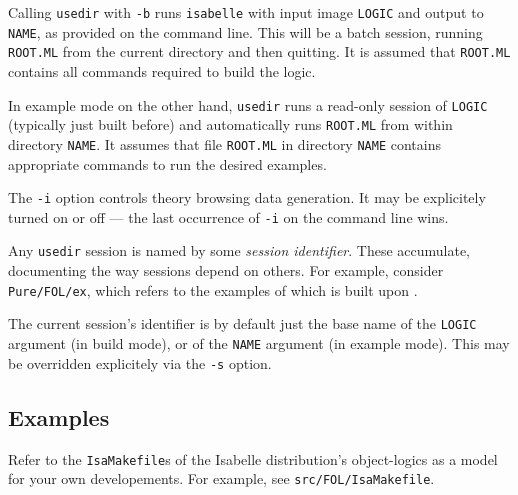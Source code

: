 Calling \texttt{usedir} with \texttt{-b} runs \texttt{isabelle} with
input image \texttt{LOGIC} and output to \texttt{NAME}, as provided on
the command line. This will be a batch session, running
\texttt{ROOT.ML} from the current directory and then quitting.  It is
assumed that \texttt{ROOT.ML} contains all {\ML} commands required to
build the logic.

In example mode on the other hand, \texttt{usedir} runs a read-only
session of \texttt{LOGIC} (typically just built before) and
automatically runs \texttt{ROOT.ML} from within directory
\texttt{NAME}.  It assumes that file \texttt{ROOT.ML} in directory
\texttt{NAME} contains appropriate {\ML} commands to run the desired
examples.

\medskip The \texttt{-i} option controls theory browsing data
generation. It may be explicitely turned on or off --- the last
occurrence of \texttt{-i} on the command line wins.

\medskip Any \texttt{usedir} session is named by some \emph{session
  identifier}. These accumulate, documenting the way sessions depend
on others. For example, consider \texttt{Pure/FOL/ex}, which refers to
the examples of {\FOL} which is built upon {\Pure}.

The current session's identifier is by default just the base name of
the \texttt{LOGIC} argument (in build mode), or of the \texttt{NAME}
argument (in example mode). This may be overridden explicitely via the
\texttt{-s} option.


\subsection*{Examples}

Refer to the \texttt{IsaMakefile}s of the Isabelle distribution's
object-logics as a model for your own developements.  For example, see
\texttt{src/FOL/IsaMakefile}.


